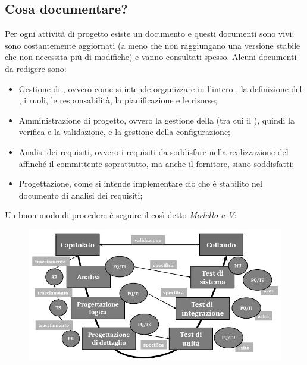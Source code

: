 \documentclass[../main]{subfiles}
\begin{document}
\subsection{Cosa documentare?}
Per ogni attività di progetto esiste un documento e questi documenti sono vivi: sono costantemente aggiornati (a meno che non raggiungano una versione stabile che non necessita più di modifiche) e vanno consultati spesso.
Alcuni documenti da redigere sono:
\begin{itemize}
    \item Gestione di , ovvero come si intende organizzare in  l'intero , la definizione del , i ruoli, le responsabilità, la pianificazione e le risorse;
    \item Amministrazione di progetto, ovvero la gestione della  (tra cui il ), quindi la verifica e la validazione, e la gestione della configurazione;
    \item Analisi dei requisiti, ovvero i requisiti da soddisfare nella realizzazione del  affinché il committente soprattutto, ma anche il fornitore, siano soddisfatti;
    \item Progettazione, come si intende implementare ciò che è stabilito nel documento di analisi dei requisiti;
\end{itemize}
Un buon modo di procedere è seguire il così detto \textit{Modello a V}:
\begin{figure}[h]
    \begin{center}
        \includegraphics[scale=0.8]{immagini/vmodel.jpg}
    \end{center}
\end{figure}
\end{document}
